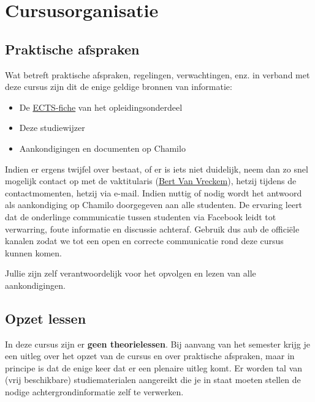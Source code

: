 \chapter{Cursusorganisatie}
\label{ch:cursusorganisatie}

\section{Praktische afspraken}
\label{sec:praktische-afspraken}

Wat betreft praktische afspraken, regelingen, verwachtingen, enz. in
verband met deze cursus zijn dit de enige geldige bronnen van
informatie:

\begin{itemize}
\item
  De
  \href{https://bamaflexweb.hogent.be/BMFUIDetailxOLOD.aspx?a=68521\&b=5\&c=1}{ECTS-fiche}
  van het opleidingsonderdeel
\item
  Deze studiewijzer
\item
  Aankondigingen en documenten op Chamilo
\end{itemize}

Indien er ergens twijfel over bestaat, of er is iets niet duidelijk,
neem dan zo snel mogelijk contact op met de vaktitularis
(\href{mailto:bert.vanvreckem@hogent.be}{Bert Van Vreckem}), hetzij
tijdens de contactmomenten, hetzij via e-mail. Indien nuttig of nodig
wordt het antwoord als aankondiging op Chamilo doorgegeven aan alle
studenten. De ervaring leert dat de onderlinge communicatie tussen
studenten via Facebook leidt tot verwarring, foute informatie en
discussie achteraf. Gebruik dus aub de officiële kanalen zodat we tot
een open en correcte communicatie rond deze cursus kunnen komen.

Jullie zijn zelf verantwoordelijk voor het opvolgen en lezen van alle
aankondigingen.

\section{Opzet lessen}
\label{sec:opzet-lessen}

In deze cursus zijn er \textbf{geen theorielessen}. Bij aanvang van het
semester krijg je een uitleg over het opzet van de cursus en over
praktische afspraken, maar in principe is dat de enige keer dat er een
plenaire uitleg komt. Er worden tal van (vrij beschikbare) studiematerialen aangereikt die je in staat moeten stellen de nodige achtergrondinformatie zelf te verwerken.

